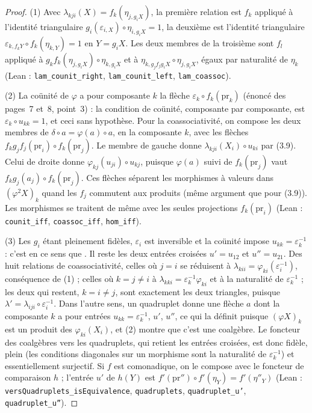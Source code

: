 \begin{proof}
(1) Avec $\lambda_{kji}(X) = f_k(\eta_{j, g_i X})$, la première relation est $f_k$ appliqué à l'identité triangulaire $g_i(\varepsilon_{i, X}) \circ \eta_{i, g_i X} = 1$, la deuxième est l'identité triangulaire $\varepsilon_{k, f_k Y} \circ f_k(\eta_{k, Y}) = 1$ en $Y = g_i X$. Les deux membres de la troisième sont $f_l$ appliqué à $g_k f_k(\eta_{j, g_i X}) \circ \eta_{k, g_i X}$ et à $\eta_{k, g_j f_j g_i X} \circ \eta_{j, g_i X}$, égaux par naturalité de $\eta_k$ (Lean : \texttt{lam\_counit\_right}, \texttt{lam\_counit\_left}, \texttt{lam\_coassoc}).

(2) La coünité de $\varphi$ a pour composante $k$ la flèche $\varepsilon_k \circ f_k(\mathrm{pr}_k)$ (énoncé des pages~7 et~8, point~3) : la condition de coünité, composante par composante, est $\varepsilon_k \circ u_{kk} = 1$, et ceci sans hypothèse. Pour la coassociativité, on compose les deux membres de $\delta \circ a = \varphi(a) \circ a$, en la composante $k$, avec les flèches $f_k g_j f_j(\mathrm{pr}_i) \circ f_k(\mathrm{pr}_j)$. Le membre de gauche donne $\lambda_{kji}(X_i) \circ u_{ki}$ par (3.9). Celui de droite donne $\varphi_{kj}(u_{ji}) \circ u_{kj}$, puisque $\varphi(a)$ suivi de $f_k(\mathrm{pr}_j)$ vaut $f_k g_j(a_j) \circ f_k(\mathrm{pr}_j)$. Ces flèches séparent les morphismes à valeurs dans $(\varphi^2 X)_k$ quand les $f_j$ commutent aux produits (même argument que pour (3.9)). Les morphismes se traitent de même avec les seules projections $f_k(\mathrm{pr}_i)$ (Lean : \texttt{counit\_iff}, \texttt{coassoc\_iff}, \texttt{hom\_iff}).

(3) Les $g_i$ étant pleinement fidèles, $\varepsilon_i$ est inversible et la coünité impose $u_{kk} = \varepsilon_k^{-1}$ : c'est en ce sens que . Il reste les deux entrées croisées $u' = u_{12}$ et $u'' = u_{21}$. Des huit relations de coassociativité, celles où $j = i$ se réduisent à $\lambda_{kii} = \varphi_{ki}(\varepsilon_i^{-1})$, conséquence de (1) ; celles où $k = j \neq i$ à $\lambda_{kki} = \varepsilon_k^{-1}\varphi_{ki}$ et à la naturalité de $\varepsilon_k^{-1}$ ; les deux qui restent, $k = i \neq j$, sont exactement les deux triangles, puisque $\lambda' = \lambda_{iji} \circ \varepsilon_i^{-1}$. Dans l'autre sens, un quadruplet donne une flèche $a$ dont la composante $k$ a pour entrées $u_{kk} = \varepsilon_k^{-1}$, $u'$, $u''$, ce qui la définit puisque $(\varphi X)_k$ est un produit des $\varphi_{ki}(X_i)$, et (2) montre que c'est une coalgèbre. Le foncteur des coalgèbres vers les quadruplets, qui retient les entrées croisées, est donc fidèle, plein (les conditions diagonales sur un morphisme sont la naturalité de $\varepsilon_k^{-1}$) et essentiellement surjectif. Si $f$ est comonadique, on le compose avec le foncteur de comparaison $h$ ; l'entrée $u'$ de $h(Y)$ est $f'(\mathrm{pr}'') \circ f'(\eta_Y) = f'(\eta''_Y)$ (Lean : \texttt{versQuadruplets\_isEquivalence}, \texttt{quadruplets}, \texttt{quadruplet\_u'}, \texttt{quadruplet\_u''}).
\end{proof}

